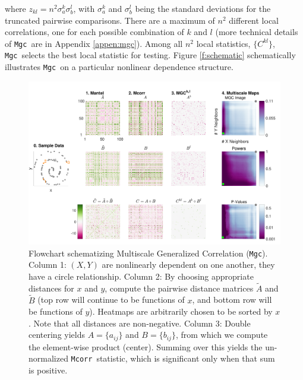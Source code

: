 \documentclass[11pt]{article}
\providecommand{\sct}[1]{{\sc \texttt{#1}}}
\newcommand{\G}{C}
\newcommand{\Mgc}{\sct{Mgc}}
\newcommand{\Mcorr}{\sct{Mcorr}}
\begin{document}
where $z_{kl}=n^2 \sigma_a^k \sigma_b^l$,  with $\sigma_a^k$ and $\sigma_b^{l}$ being the standard deviations for the truncated pairwise comparisons. There are a maximum of $n^2$ different local correlations, one for each possible combination of $k$ and $l$ (more technical details of \Mgc~are in Appendix \ref{appen:mgc}).
Among all $n^2$ local statistics, $\{\G^{kl}\}$, \Mgc~selects the best local statistic for testing. %
Figure \ref{f:schematic} schematically illustrates \Mgc~on a particular nonlinear dependence structure.


\begin{figure}[htbp]
\includegraphics[width=1.0\textwidth]{../Figures/FigA}
\caption{
Flowchart schematizing Multiscale Generalized Correlation (\Mgc).
Column 1: $(X,Y)$ are nonlinearly dependent on one another, they have a circle relationship.
Column 2: By choosing appropriate distances for $x$ and $y$, compute the pairwise distance matrices $\tilde{A}$ and $\tilde{B}$ (top row will continue to be functions of $x$, and bottom row will be functions of $y$).  
Heatmaps  are arbitrarily chosen to be sorted by $x$. 
Note that all distances are non-negative.
Column 3: Double centering yields $A=\{a_{ij}\}$ and $B=\{b_{ij}\}$, from which we compute the element-wise product (center).  Summing over this yields 
the un-normalized \Mcorr~statistic, which is significant only when that sum is positive. 
}
\end{figure}
\end{document}
